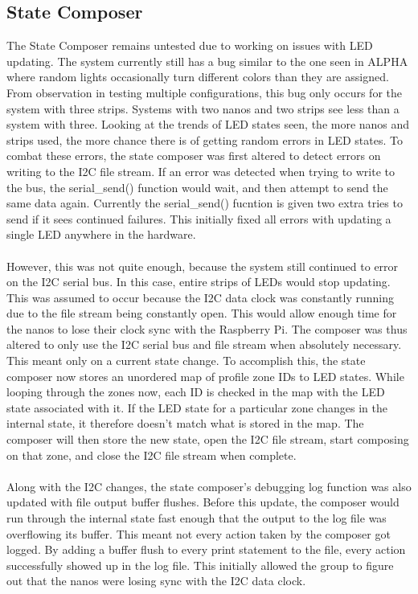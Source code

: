 \documentclass[onecolumn, draftclsnofoot,10pt, compsoc]{IEEEtran}
\begin{document}
	\subsection{State Composer}
		\noindent The State Composer remains untested due to working on issues with LED updating. The system currently still has a bug similar to the one 
		seen in ALPHA where random lights occasionally turn different colors than they are assigned. From observation in testing multiple configurations, 
		this bug only occurs for the system with three strips. Systems with two nanos and two strips see less than a system with three. Looking at the trends 
		of LED states seen,	the more nanos and strips used, the more chance there is of getting random errors in LED states. To combat these errors, the state 
		composer was first altered to detect errors on writing to the I2C file stream. If an error was detected when trying to write to the bus, the 
		serial_send() function would wait, and then attempt to send the same data again.  Currently the serial_send() fucntion is given two extra tries to 
		send if it sees continued failures. This initially fixed all errors with updating a single LED anywhere in the hardware. 
		\\\\
		\noindent However, this was not quite enough, because the system still continued to error on the I2C serial bus. In this case, entire strips of LEDs 
		would stop updating. This was assumed to occur because the I2C data clock was constantly running due to the file stream being constantly open. This 
		would allow enough time for the nanos to lose their clock sync with the Raspberry Pi. The composer was thus altered to only use the I2C serial bus and 
		file stream when absolutely necessary. This meant only on a current state change. To accomplish this, the state composer now stores an unordered map 
		of profile zone IDs to LED states. While looping through the zones now, each ID is checked in the map with the LED state associated with it. If the LED 
		state for a particular zone changes in the internal state, it therefore doesn't match what is stored in the map. The composer will then store the new 
		state, open the I2C file stream, start composing on that zone, and close the I2C file stream when complete. 
		\\\\
		\noindent Along with the I2C changes, the state composer's debugging log function was also updated with file output buffer flushes. Before this 
		update, the	composer would run through the internal state fast enough that the output to the log file was overflowing its buffer. This meant not every 
		action taken by the composer got logged. By adding a buffer flush to every print statement to the file, every action successfully showed up in the log 
		file. This initially allowed the group to figure out that the nanos were losing sync with the I2C data clock. 
		\\\\
\end{document}
